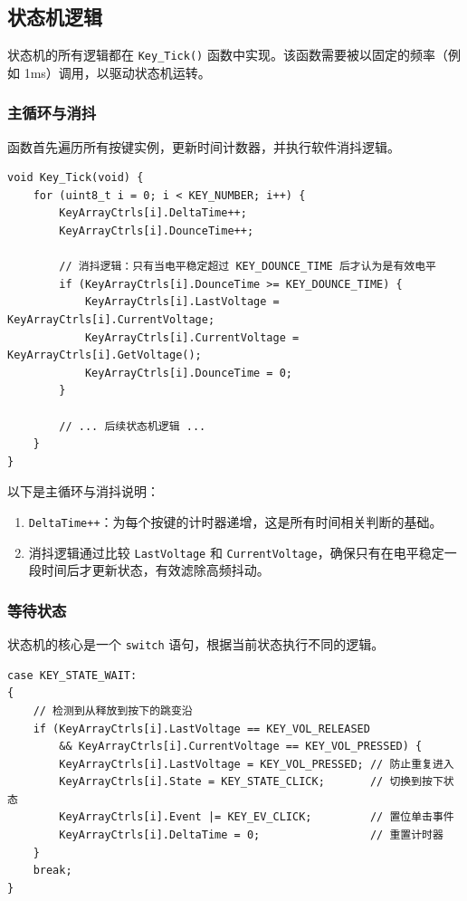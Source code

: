 \subsection{状态机逻辑}

状态机的所有逻辑都在 \texttt{Key\_Tick()} 函数中实现。该函数需要被以固定的频率（例如 1ms）调用，以驱动状态机运转。

\subsubsection{主循环与消抖}

函数首先遍历所有按键实例，更新时间计数器，并执行软件消抖逻辑。

\begin{lstlisting}[style=c]
void Key_Tick(void) {
    for (uint8_t i = 0; i < KEY_NUMBER; i++) {
        KeyArrayCtrls[i].DeltaTime++;
        KeyArrayCtrls[i].DounceTime++;

        // 消抖逻辑：只有当电平稳定超过 KEY_DOUNCE_TIME 后才认为是有效电平
        if (KeyArrayCtrls[i].DounceTime >= KEY_DOUNCE_TIME) {
            KeyArrayCtrls[i].LastVoltage = KeyArrayCtrls[i].CurrentVoltage;
            KeyArrayCtrls[i].CurrentVoltage = KeyArrayCtrls[i].GetVoltage();
            KeyArrayCtrls[i].DounceTime = 0;
        }

        // ... 后续状态机逻辑 ...
    }
}
\end{lstlisting}

以下是主循环与消抖说明：

\begin{enumerate}
\item \texttt{DeltaTime++}：为每个按键的计时器递增，这是所有时间相关判断的基础。
\item 消抖逻辑通过比较 \texttt{LastVoltage} 和 \texttt{CurrentVoltage}，确保只有在电平稳定一段时间后才更新状态，有效滤除高频抖动。
\end{enumerate}

\subsubsection{等待状态}

状态机的核心是一个 \texttt{switch} 语句，根据当前状态执行不同的逻辑。

\begin{lstlisting}[style=c]
case KEY_STATE_WAIT:
{
    // 检测到从释放到按下的跳变沿
    if (KeyArrayCtrls[i].LastVoltage == KEY_VOL_RELEASED
        && KeyArrayCtrls[i].CurrentVoltage == KEY_VOL_PRESSED) {
        KeyArrayCtrls[i].LastVoltage = KEY_VOL_PRESSED; // 防止重复进入
        KeyArrayCtrls[i].State = KEY_STATE_CLICK;       // 切换到按下状态
        KeyArrayCtrls[i].Event |= KEY_EV_CLICK;         // 置位单击事件
        KeyArrayCtrls[i].DeltaTime = 0;                 // 重置计时器
    }
    break;
}
\end{lstlisting}

